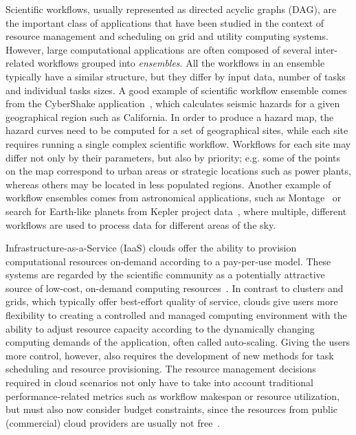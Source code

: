 \documentclass{sig-alternate}
\begin{document}
Scientific workflows, usually represented as directed acyclic graphs (DAG), are
the important class of applications that have been studied in the context of
resource management and scheduling on grid and utility computing systems.
However, large computational applications are often composed of several 
inter-related workflows grouped into {\em ensembles}. All the
workflows in an ensemble typically have a similar structure, but they differ by
input data, number of tasks and individual tasks sizes. A good example of
scientific workflow ensemble comes from the CyberShake
application~\cite{Callaghan11}, which calculates seismic hazards for a given
geographical region such as California. In order to produce a hazard map, the
hazard curves need to be computed for a set of geographical sites, while each
site requires running a single complex scientific workflow. Workflows for each
site may differ not only by their parameters, but also by priority; e.g. some of
the points on the map correspond to urban areas or strategic locations such as
power plants, whereas others may be located in less populated regions. Another
example of workflow ensembles comes from astronomical applications, such as
Montage~\cite{Deelman08} or search for Earth-like planets from Kepler project
data~\cite{vockler11}, where multiple, different workflows are used to
process data for different areas of the sky.

Infrastructure-as-a-Service (IaaS) clouds offer the ability to provision 
computational resources on-demand according to a pay-per-use model. These systems 
are regarded by the scientific community as a potentially attractive source of 
low-cost, on-demand computing resources~\cite{Ostermann10,Keahey09}. In contrast 
to clusters and grids, which typically offer best-effort quality of service, clouds 
give users more flexibility to creating a controlled and managed computing environment
with the ability to adjust resource capacity according to the dynamically changing
computing demands of the application, often called auto-scaling. Giving the users 
more control, however, also requires the development of new methods for task 
scheduling and resource provisioning. The resource management decisions required 
in cloud scenarios not only have to take into account traditional performance-related 
metrics such as workflow makespan or resource utilization, but must also now consider
budget constraints, since the resources from public (commercial) cloud providers 
are usually not free~\cite{Durkee10}.
\end{document}
